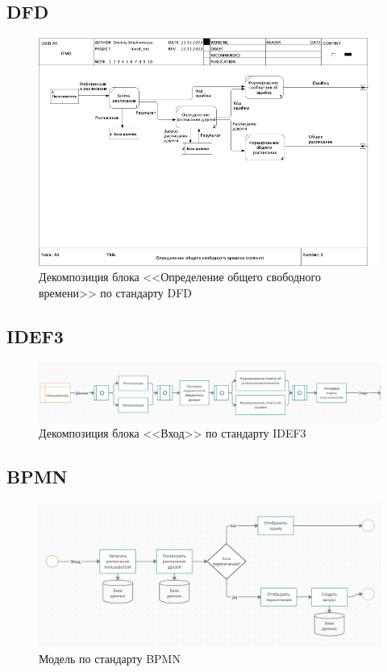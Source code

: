 \documentclass[aspectratio=169]{beamer}
\begin{document}
\subsection{DFD}
\begin{frame}
    \begin{figure}
        \includegraphics[scale=.35]{img/DFD2.png}
        \caption{Декомпозиция блока <<Определение общего свободного времени>> по стандарту DFD}
    \end{figure}
\end{frame}
\subsection{IDEF3}
\begin{frame}
    \begin{figure}
        \includegraphics[scale=.4]{img/IDEF3-2-0.png}
        \caption{Декомпозиция блока <<Вход>> по стандарту IDEF3}
    \end{figure}
\end{frame}

\subsection{BPMN}
\begin{frame}
    \begin{figure}
        \includegraphics[scale=.4]{img/BPMN.png}
        \caption{Модель по стандарту BPMN}
    \end{figure}
\end{frame}
\end{document}
